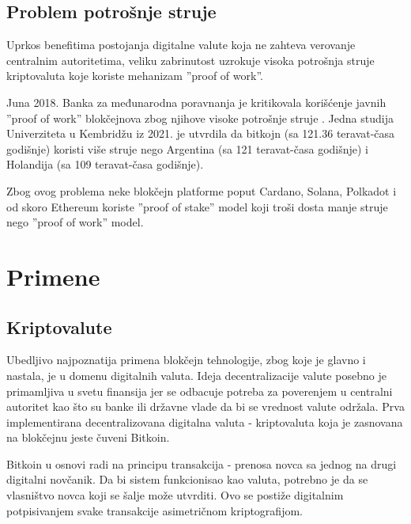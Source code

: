 \documentclass[a4paper]{article}
\begin{document}
\subsection{Problem potrošnje struje}
Uprkos benefitima postojanja digitalne valute koja ne zahteva verovanje centralnim autoritetima, veliku zabrinutost uzrokuje visoka potrošnja struje kriptovaluta koje koriste mehanizam ''proof of work''.

Juna 2018. Banka za međunarodna poravnanja je kritikovala korišćenje javnih ''proof of work'' blokčejnova zbog njihove visoke potrošnje struje \cite{shin2018chapterVcryptocurrencies}. 
Jedna studija Univerziteta u Kembridžu iz 2021. je utvrdila da bitkojn (sa 121.36 teravat-časa godišnje) koristi više struje nego Argentina (sa 121 teravat-časa godišnje) i Holandija (sa 109 teravat-časa godišnje). \cite{criddle2021bitcoin-electricity}

Zbog ovog problema neke blokčejn platforme poput Cardano, Solana, Polkadot i od skoro Ethereum koriste ''proof of stake'' model koji troši dosta manje struje nego ''proof of work'' model.

\section{Primene}
\label{sec:primene}

\subsection{Kriptovalute}
Ubedljivo najpoznatija primena blokčejn tehnologije, zbog koje je glavno i nastala, je u domenu digitalnih valuta.
Ideja decentralizacije valute posebno je primamljiva u svetu finansija jer se odbacuje potreba za poverenjem
u centralni autoritet kao što su banke ili državne vlade da bi se vrednost valute održala. 
Prva implementirana decentralizovana digitalna valuta - kriptovaluta koja je zasnovana na blokčejnu jeste čuveni Bitkoin.

Bitkoin u osnovi radi na principu transakcija - prenosa novca sa jednog na drugi digitalni novčanik. Da bi sistem funkcionisao
kao valuta, potrebno je da se vlasništvo novca koji se šalje može utvrditi. Ovo se postiže digitalnim potpisivanjem svake transakcije
asimetričnom kriptografijom.
\end{document}
